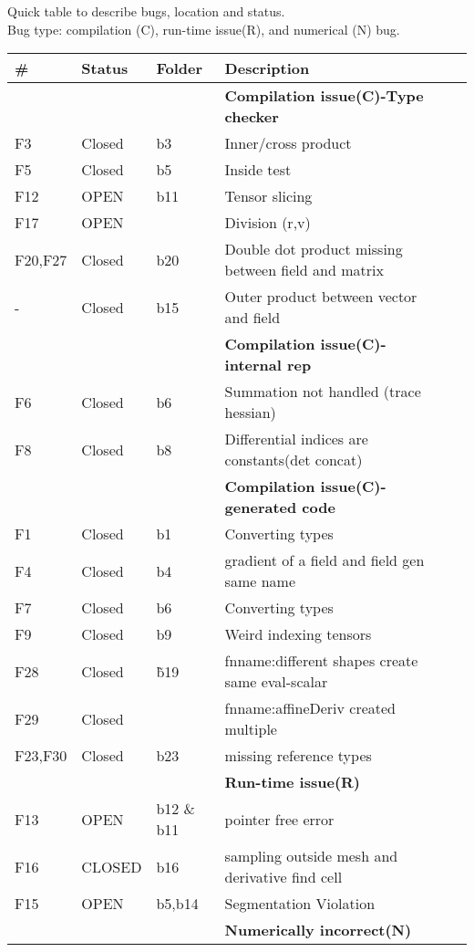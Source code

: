 \documentclass{article}
\begin{document}
Quick table to describe bugs, location and status.\\
Bug type:  compilation (C), run-time issue(R), and numerical (N) bug.\\



\begin{tabular}{|l|ll|lll|}
\hline
\# & Status & Folder & Description \\
\hline
\hline
&&& \textbf{Compilation issue(C)-Type checker}\\
\hline
 F3 &Closed&b3  & Inner/cross product  \\
 F5 &Closed&b5& Inside test\\
  F12 &OPEN & b11 & Tensor slicing\\
F17 &OPEN &   & Division (r,v)\\
  F20,F27 &Closed &  b20 & Double dot product missing between field and matrix\\
- &  Closed & b15 & Outer product between vector and field \\
  \hline
  \hline
   &&& \textbf{Compilation issue(C)-internal rep}\\
     \hline
   F6 &Closed &b6  & Summation not handled (trace hessian) \\
     F8 &Closed &b8 &Differential indices are constants(det concat)\\
  \hline
  \hline 
 &&& \textbf{Compilation issue(C)-generated code}\\
 \hline
 F1 &Closed& b1& Converting types\\
  F4 &Closed&b4 & gradient of a field and  field gen same name\\
  F7 &Closed& b6  & Converting types\\
F9 &Closed&b9 & Weird indexing tensors\\
 F28 & Closed & \~ b19 & fnname:different shapes create same eval-scalar\\
  F29 & Closed && fnname:affineDeriv created multiple\\
    F23,F30 & Closed &b23& missing reference types\\
   \hline
  \hline
 &&& \textbf{Run-time issue(R)}\\
 \hline
  F13 &OPEN & b12 \& b11  &pointer free error\\
    F16 &CLOSED & b16  & sampling outside mesh and derivative find cell  \\
   F15 &OPEN&b5,b14 &Segmentation Violation\\
  \hline
  \hline
 &&& \textbf{Numerically incorrect(N)}\\

\end{tabular}
\end{document}
